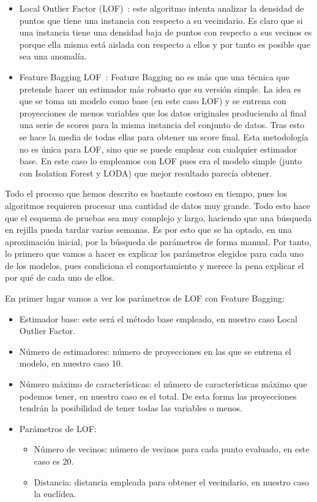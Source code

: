 \begin{itemize}
	\item Local Outlier Factor (LOF)~\cite{markus_m_lof_2000}: este algoritmo intenta analizar la densidad de puntos que tiene una instancia con respecto a su vecindario. Es claro que si una instancia tiene una densidad baja de puntos con respecto a sus vecinos es porque ella misma está aislada con respecto a ellos y por tanto es posible que sea una anomalía.
	\item Feature Bagging LOF~\cite{lazarevic_feature_2005}: Feature Bagging no es más que una técnica que pretende hacer un estimador más robusto que su versión simple. La idea es que se toma un modelo como base (en este caso LOF) y se entrena con proyecciones de menos variables que los datos originales produciendo al final una serie de scores para la misma instancia del conjunto de datos. Tras esto se hace la media de todas ellas para obtener un score final. Esta metodología no es única para LOF, sino que se puede emplear con cualquier estimador base. En este caso lo empleamos con LOF pues era el modelo simple (junto con Isolation Forest y LODA) que mejor resultado parecía obtener.
\end{itemize}

Todo el proceso que hemos descrito es bastante costoso en tiempo, pues los algoritmos requieren procesar una cantidad de datos muy grande. Todo esto hace que el esquema de pruebas sea muy complejo y largo, haciendo que una búsqueda en rejilla pueda tardar varias semanas. Es por esto que se ha optado, en una aproximación inicial, por la búsqueda de parámetros de forma manual. Por tanto, lo primero que vamos a hacer es explicar los parámetros elegidos para cada uno de los modelos, pues condiciona el comportamiento y merece la pena explicar el por qué de cada uno de ellos.

En primer lugar vamos a ver los parámetros de LOF con Feature Bagging:
\begin{itemize}
	\item Estimador base: este será el método base empleado, en nuestro caso Local Outlier Factor.
	\item Número de estimadores: número de proyecciones en las que se entrena el modelo, en nuestro caso 10.
	\item Número máximo de características: el número de características máximo que podemos tener, en nuestro caso es el total. De esta forma las proyecciones tendrán la posibilidad de tener todas las variables o menos.
	\item Parámetros de LOF:
	\begin{itemize}
		\item Número de vecinos: número de vecinos para cada punto evaluado, en este caso es 20.
		\item Distancia: distancia empleada para obtener el vecindario, en nuestro caso la euclídea.
	\end{itemize}
\end{itemize}

